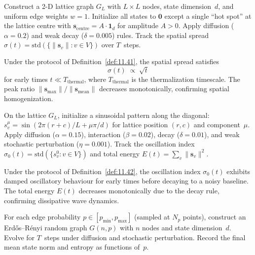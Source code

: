 \begin{definition}
\label{def:11.41}
Construct a 2-D lattice graph $G_L$ with $L \times L$ nodes, state
dimension~$d$, and uniform edge weights $w = 1$.  Initialize all
states to $\mathbf{0}$ except a single ``hot spot'' at the lattice
centre with $\mathbf{s}_{\mathrm{centre}} = A \cdot \mathbf{1}_d$ for
amplitude $A > 0$.  Apply diffusion ($\alpha = 0.2$) and weak
decay ($\delta = 0.005$) rules.  Track the spatial spread
$\sigma(t) = \mathrm{std}(\{\|\mathbf{s}_v\| : v \in V\})$ over
$T$~steps.
\end{definition}

\begin{proposition}
\label{prop:11.1}
Under the protocol of Definition~\ref{def:11.41}, the spatial spread
satisfies
\begin{equation}
\label{eq:11.diffusion_law}
  \sigma(t) \;\propto\; \sqrt{t}
\end{equation}
for early times $t \ll T_{\mathrm{thermal}}$, where
$T_{\mathrm{thermal}}$ is the thermalization timescale.  The peak
ratio $\|\mathbf{s}_{\max}\| / \|\mathbf{s}_{\mathrm{mean}}\|$
decreases monotonically, confirming spatial homogenization.
\end{proposition}

\begin{definition}
\label{def:11.42}
On the lattice $G_L$, initialize a sinusoidal pattern along the
diagonal: $s_v^\mu = \sin(2\pi(r+c)/L + \mu\pi/d)$ for lattice
position $(r,c)$ and component~$\mu$.  Apply diffusion
($\alpha = 0.15$), interaction ($\beta = 0.02$), decay
($\delta = 0.01$), and weak stochastic perturbation
($\eta = 0.001$).  Track the oscillation index
$\sigma_0(t) = \mathrm{std}(\{s_v^0 : v \in V\})$ and total energy
$E(t) = \sum_v \|\mathbf{s}_v\|^2$.
\end{definition}

\begin{proposition}
\label{prop:11.2}
Under the protocol of Definition~\ref{def:11.42}, the oscillation
index $\sigma_0(t)$ exhibits damped oscillatory behaviour for early
times before decaying to a noisy baseline.  The total energy $E(t)$
decreases monotonically due to the decay rule, confirming dissipative
wave dynamics.
\end{proposition}

\begin{definition}
\label{def:11.43}
For each edge probability $p \in [p_{\min}, p_{\max}]$ (sampled at
$N_p$ points), construct an Erd\H{o}s--R\'enyi random graph
$G(n, p)$ with $n$ nodes and state dimension~$d$.  Evolve for
$T$~steps under diffusion and stochastic perturbation.  Record the
final mean state norm and entropy as functions of~$p$.
\end{definition}

